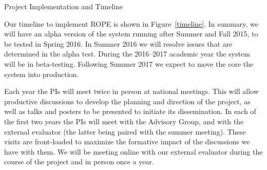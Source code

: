 \documentclass[11pt]{article}
\begin{document}
\begin{section}{Project Implementation and Timeline}

Our timeline to implement ROPE is shown in Figure~\ref{timeline}.  In
summary, we will have an alpha version of the system running after Summer
and Fall 2015, to be tested in Spring 2016.  In Summer 2016 we will
resolve issues that are determined in the alpha test.  During the
2016--2017 academic year the system will be in beta-testing.  Following
Summer 2017 we expect to move the core the system into production.

Each year the PIs will meet twice in person at national meetings.  This
will allow productive discussions to develop the planning and
direction of the project, as well as talks and posters to be presented to
initiate its dissemination.  In each of the first two years the PIs will meet with the
Advisory Group, and with the external evaluator (the latter being paired
with the summer meeting).  These visits are front-loaded to maximize the
formative impact of the discussions we have with them.  We
will be meeting online with our external evaluator during the course of the
project and in person once a year.


\end{section}
\end{document}
